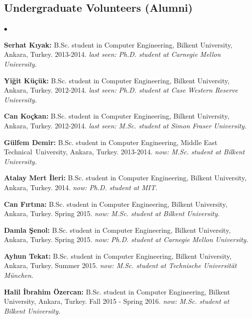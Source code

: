 \documentclass[margin,line]{res}
\newenvironment{list2}{
  \begin{list}{$\bullet$}{%
      \setlength{\itemsep}{0in}
      \setlength{\parsep}{0in} \setlength{\parskip}{0in}
      \setlength{\topsep}{0in} \setlength{\partopsep}{0in} 
      \setlength{\leftmargin}{0.2in}}}{\end{list}}
\begin{document}
\begin{resume}
\vspace*{-.6cm}
\subsection{\small \sc Undergraduate Volunteers (Alumni)}
\begin{list2}
\item {\bf Serhat Kıyak:} B.Sc. student in Computer Engineering,  Bilkent University, Ankara, Turkey. 2013-2014. {\it last seen: Ph.D. student at Carnegie Mellon University.}
\item {\bf Yiğit Küçük:} B.Sc. student in Computer Engineering,  Bilkent University, Ankara, Turkey. 2012-2014. {\it last seen: Ph.D. student at Case Western Reserve University.}
\item {\bf Can Koçkan:} B.Sc. student in Computer Engineering,  Bilkent University, Ankara, Turkey.  2012-2014. {\it last seen: M.Sc. student at Simon Fraser University.}
\item {\bf Gülfem Demir:} B.Sc. student in Computer Engineering,  Middle East Technical\ University, Ankara, Turkey. 2013-2014. {\it now: M.Sc. student at Bilkent University.}
\item {\bf Atalay Mert İleri:} B.Sc. student in Computer Engineering, Bilkent University, Ankara, Turkey. 2014. {\it now: Ph.D. student at MIT.}
\item {\bf Can Fırtına:} B.Sc. student in Computer Engineering,  Bilkent University, Ankara, Turkey. Spring 2015. {\it now: M.Sc. student at Bilkent University.} 
\item {\bf Damla Şenol:} B.Sc. student in Computer Engineering,  Bilkent University, Ankara, Turkey. Spring 2015. {\it now: Ph.D. student at Carnegie Mellon University.}
\item  {\bf Ayhun Tekat:} B.Sc. student in Computer Engineering,  Bilkent University, Ankara, Turkey. Summer 2015. {\it now: M.Sc. student at Technische Universität München.}
\item {\bf Halil İbrahim Özercan:} B.Sc. student in Computer Engineering,  Bilkent University, Ankara, Turkey. Fall 2015 - Spring 2016. {\it now: M.Sc. student at Bilkent University.}
\end{list2}

  

\end{resume}
\end{document}
